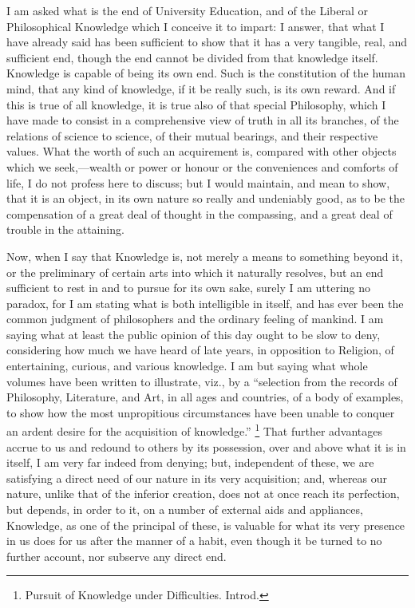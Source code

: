 I am asked what is the end of University Education, and of the
Liberal or Philosophical Knowledge which I conceive it to impart: I
answer, that what I have already said has been sufficient to
show that it has a very tangible, real, and sufficient end, though the
end cannot be divided from that knowledge itself. Knowledge is capable
of being its own end. Such is the constitution of the human mind, that
any kind of knowledge, if it be really such, is its own reward. And if
this is true of all knowledge, it is true also of that special
Philosophy, which I have made to consist in a comprehensive view of
truth in all its branches, of the relations of science to science, of
their mutual bearings, and their respective values. What the worth of
such an acquirement is, compared with other objects which we seek,—wealth
or power or honour or the conveniences and comforts of life, I do not
profess here to discuss; but I would maintain, and mean to show, that
it is an object, in its own nature so really and undeniably good, as
to be the compensation of a great deal of thought in the compassing,
and a great deal of trouble in the attaining.

Now, when I say that Knowledge is, not merely a means to something
beyond it, or the preliminary of certain arts into which it naturally
resolves, but an end sufficient to rest in and to pursue for its own
sake, surely I am uttering no paradox, for I am stating what is both
intelligible in itself, and has ever been the common judgment of
philosophers and the ordinary feeling of mankind. I am saying what at
least the public opinion of this day ought to be slow to deny,
considering how much we have heard of late years, in opposition to
Religion, of entertaining, curious, and various knowledge. I am but
saying what whole volumes have been written to illustrate, viz., by a
``selection from the records of Philosophy, Literature, and Art,
in all ages and countries, of a body of examples, to show how the most
unpropitious circumstances have been unable to conquer an ardent desire for the acquisition of knowledge.'' \footnote{Pursuit of Knowledge under Difficulties. Introd.} That further advantages accrue to us and redound to others
by its possession, over and above what it is in itself, I am very far
indeed from denying; but, independent of these, we are satisfying a
direct need of our nature in its very acquisition; and, whereas our
nature, unlike that of the inferior creation, does not at once reach
its perfection, but depends, in order to it, on a number of external
aids and appliances, Knowledge, as one of the principal of these, is
valuable for what its very presence in us does for us after the manner
of a habit, even though it be turned to no further account, nor
subserve any direct end.

